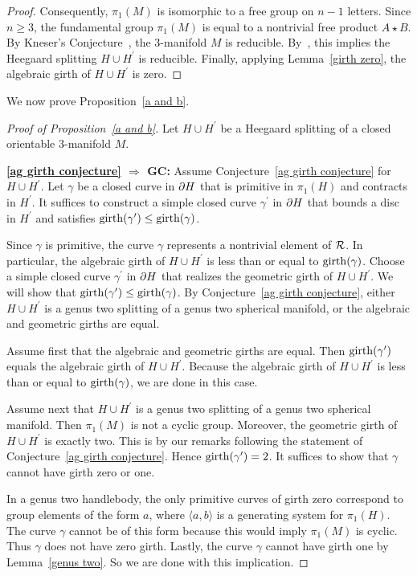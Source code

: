 \begin{proof}
Consequently, $\pi_{1}(M)$ is isomorphic to a free group on $n-1$ letters.  Since $n\geq 3$, the fundamental group $\pi_{1}(M)$ is equal to a nontrivial free product $A\star B$.  By Kneser's Conjecture~\cite[Theorem II.A.3]{St2}, the 3-manifold $M$ is reducible.  By~\cite{Ha}, this implies the Heegaard splitting $H\cup H^{\prime}$ is reducible.  Finally, applying Lemma~\ref{girth zero}, the algebraic girth of $H\cup H^{\prime}$ is zero.
\end{proof}

We now prove Proposition~\ref{a and b}.

\begin{proof}[Proof of Proposition~\ref{a and b}]
Let $H\cup H^\prime$ be a Heegaard splitting of a closed
orientable 3-manifold $M$.

\textbf{\ref{ag girth conjecture} $\Rightarrow$ GC:}  
Assume Conjecture~\ref{ag girth conjecture} for $H\cup H^{\prime}$.
Let $\gamma$ be a closed curve in $\partial H$ that is primitive 
in $\pi_1(H)$ and contracts in $H^\prime$.  It suffices to construct a simple closed curve $\gamma^{\prime}$ in $\partial H$ that bounds a disc in $H^{\prime}$ and satisfies $\operatorname{girth}(\gamma^{\prime}) \leq \operatorname{girth}(\gamma)$.

Since $\gamma$ is primitive, the curve $\gamma$ represents a nontrivial element of $\mathcal{R}$.  In particular, the algebraic girth of $H\cup H^\prime$
is less than or equal to $\operatorname{girth}(\gamma)$.
Choose a simple closed curve $\gamma^\prime$ in $\partial H$ that 
realizes the geometric girth of $H\cup H^\prime$.  
We will show that $\operatorname{girth}(\gamma^{\prime}) \leq \operatorname{girth}(\gamma)$.  By Conjecture~\ref{ag girth conjecture}, either $H\cup H^{\prime}$ is a genus two splitting of a genus two spherical manifold, or the algebraic and geometric girths are equal.

Assume first that the algebraic and geometric girths are equal.  Then $\operatorname{girth}(\gamma^{\prime})$ equals the algebraic girth of $H\cup H^\prime$.  Because the algebraic girth of $H\cup H^\prime$ is less than or equal to $\operatorname{girth}(\gamma)$, we are done in this case.

Assume next that $H\cup H^\prime$ is a genus two splitting of 
a genus two spherical manifold.  Then $\pi_1(M)$ is not a 
cyclic group.  Moreover, the geometric girth of $H\cup H^\prime$
is exactly two.  This is by our remarks following the statement of Conjecture~\ref{ag girth conjecture}.  Hence $\operatorname{girth}(\gamma^\prime)=2$.  It suffices to show that $\gamma$ cannot have girth zero or one.

In a genus two handlebody, the only primitive curves of girth zero 
correspond to group elements of the form $a$, where $\langle a, b \rangle$ is a 
generating system for $\pi_1(H)$.  The curve $\gamma$ cannot be of this form because this would imply $\pi_1(M)$ is cyclic.  Thus $\gamma$ does not have zero girth.  Lastly, the curve $\gamma$ cannot have girth one by Lemma~\ref{genus two}.  So we are done with this implication.


\end{proof}
